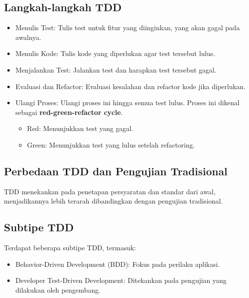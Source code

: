 \documentclass{article}
\begin{document}
\subsection{Langkah-langkah TDD}
\begin{itemize}
    \item Menulis Test: Tulis test untuk fitur yang diinginkan, yang akan gagal pada awalnya.
    \item Menulis Kode: Tulis kode yang diperlukan agar test tersebut lulus.
    \item Menjalankan Test: Jalankan test dan harapkan test tersebut gagal.
    \item Evaluasi dan Refactor: Evaluasi kesalahan dan refactor kode jika diperlukan.
    \item Ulangi Proses: Ulangi proses ini hingga semua test lulus. Proses ini dikenal sebagai \textbf{red-green-refactor cycle}.
          \begin{itemize}
              \item Red: Menunjukkan test yang gagal.
              \item Green: Menunjukkan test yang lulus setelah refactoring.
          \end{itemize}
\end{itemize}

\subsection{Perbedaan TDD dan Pengujian Tradisional}
TDD menekankan pada penetapan persyaratan dan standar dari awal, menjadikannya lebih terarah dibandingkan dengan pengujian tradisional.

\subsection{Subtipe TDD}
Terdapat beberapa subtipe TDD, termasuk:
\begin{itemize}
    \item Behavior-Driven Development (BDD): Fokus pada perilaku aplikasi.
    \item Developer Test-Driven Development: Ditekankan pada pengujian yang dilakukan oleh pengembang.
\end{itemize}


\newpage


\end{document}
